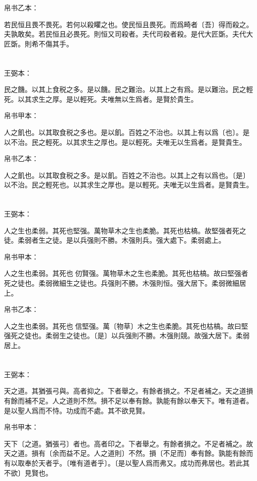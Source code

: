 \documentclass[a5paper]{ctexbook}
\begin{document}
    帛书乙本：

    若民恒且畏不畏死。若何以殺䂂之也。使民恒且畏死。而爲畸者〔吾〕得而殺之。夫孰敢矣。若民恒且必畏死。則恒又司殺者。夫代司殺者殺。是代大匠斲。夫代大匠斲。則希不傷其手。

    \chapter{}
    王弼本：

    民之饑。以其上食税之多。是以饑。民之難治。以其上之有爲。是以難治。民之輕死。以其求生之厚。是以輕死。夫唯無以生爲者。是賢於貴生。

    
    帛书甲本：

    人之飢也。以其取食税之多也。是以飢。百姓之不治也。以其上有以爲〔也〕。是以不治。民之輕死。以其求生之厚也。是以輕死。夫唯无以生爲者。是賢貴生。

    帛书乙本：

    人之飢也。以其取食税之多。是以飢。百姓之不治也。以其上之有以爲也。〔是〕以不治。民之輕死也。以其求生之厚也。是以輕死。夫唯无以生爲者。是賢貴生。

    \chapter{}
    王弼本：

    人之生也柔弱。其死也堅强。萬物草木之生也柔脆。其死也枯槁。故堅强者死之徒。柔弱者生之徒。是以兵强則不勝。木强則兵。强大處下。柔弱處上。

    
    帛书甲本：

    人之生也柔弱。其死也𦵕仞賢强。萬物草木之生也柔脆。其死也枯槁。故曰堅强者死之徒也。柔弱微細生之徒也。兵强則不勝。木强則恒。强大居下。柔弱微細居上。

    帛书乙本：

    人之生也柔弱。其死也󱁌信堅强。萬〔物草〕木之生也柔脆。其死也枯槁。故曰堅强死之徒也。柔弱生之徒也。〔是〕以兵强則不勝。木强則競。故强大居下。柔弱居上。

    \chapter{}
    王弼本：

    天之道。其猶張弓與。高者抑之。下者舉之。有餘者損之。不足者補之。天之道損有餘而補不足。人之道則不然。損不足以奉有餘。孰能有餘以奉天下。唯有道者。是以聖人爲而不恃。功成而不處。其不欲見賢。

    
    帛书甲本：

    天下〔之道。猶張弓〕者也。高者印之。下者舉之。有餘者損之。不足者補之。故天之道。損有〔余而益不足。人之道則〕不然。損〔不足而〕奉有餘。孰能有餘而有以取奉於天者乎。〔唯有道者乎〕。〔是以聖人爲而弗又。成功而弗居也。若此其不欲〕見賢也。
\end{document}
